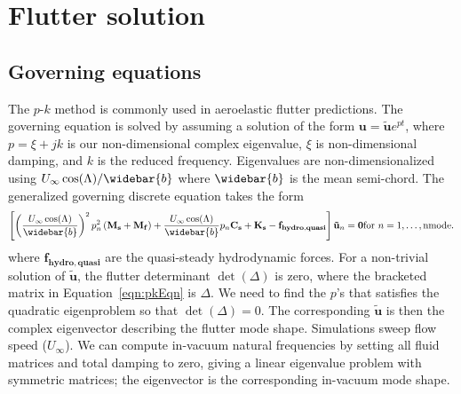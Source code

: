 \documentclass[10pt]{article}
\newcommand{\mbf}[1]{\mathbf{#1}}
\newcommand{\Uinf}{U_{\infty}}
\newcommand{\tn}[1]{\textnormal{#1}}
\begin{document}
\clearpage
\section{Flutter solution}
\subsection{Governing equations}
% 
The $p$-$k$ method is commonly used in aeroelastic flutter predictions.
The governing equation is solved by assuming a solution of the form
$    \mbf{u} = \tilde{\mbf{u}}e^{pt}$,
%
where $p=\xi + j k$ is our non-dimensional complex eigenvalue, $\xi$ is non-dimensional damping, and $k$ is the reduced frequency.
Eigenvalues are non-dimensionalized using $\Uinf \cos(\Lambda)/\widebar{b}$ where $\widebar{b}$ is the mean semi-chord.
The generalized governing discrete equation takes the form
\begin{multline}
    \label{eqn:pkEqn}
    \left[
        \left( \frac{\Uinf\cos(\Lambda)}{\widebar{b}} \right)^2
        p_n^2\left(   \mbf{M_s}   + \mbf{M_f}\right)
        + \frac{\Uinf\cos(\Lambda)}{\widebar{b}}
        p_n\mbf{C_s}
        + \mbf{K_s}
        - \mbf{f_{hydro,quasi}}
        \right]
    \mbf{\tilde{u}}_n = \mbf{0}
    \hfill
    \tn{for }n = 1,\ldots,\tn{nmode}.
\end{multline}
where $\mbf{f_{hydro,quasi}}$ are the quasi-steady hydrodynamic forces.
For a non-trivial solution of $\mbf{\tilde{u}}$, the flutter determinant $\det(\Delta)$ is zero, where the bracketed matrix in Equation~\eqref{eqn:pkEqn} is $\Delta$.
We need to find the $p$'s that satisfies the quadratic eigenproblem so that $\det(\Delta) = 0$.
The corresponding $\mbf{\tilde{u}}$ is then the complex eigenvector describing the flutter mode shape.
Simulations sweep flow speed ($\Uinf$).
We can compute in-vacuum natural frequencies by setting all fluid matrices and total damping to zero, giving a linear eigenvalue problem with symmetric matrices;
the eigenvector is the corresponding in-vacuum mode shape.
\end{document}
